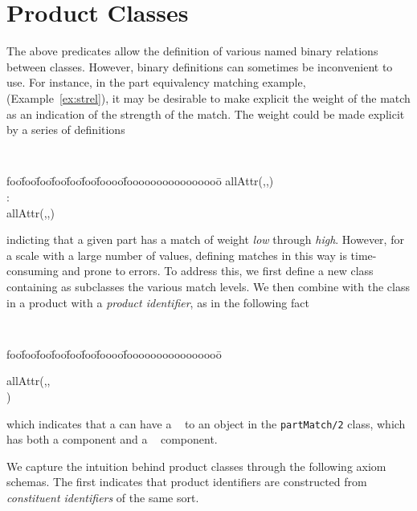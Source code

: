 \section{Product Classes}

The above predicates allow the definition of various named binary
relations between classes.  However, binary definitions can sometimes
be inconvenient to use.  For instance, in the part equivalency
matching example, (Example~\ref{ex:strel}), it may be desirable to
make explicit the weight of the match as an indication of the strength
of the match.  The weight could be made explicit by a series of
definitions
{\small 
{\tt 
\begin{tabbing}
foo\=foo\=foo\=foo\=foo\=foo\=foooo\=foooooooooooooooo\=\kill
\> allAttr(,,) \\
\> : \\
\> allAttr(,,)
\end{tabbing}
} } 
\noindent
indicting that a given part has a match of weight {\em low} through
{\em high}.  However, for a scale with a large number of values,
defining matches in this way is time-consuming and prone to errors.
To address this, we first define a new class {\tt {}}
containing as subclasses the various match levels.  We then combine
{\tt {}} with the class {\tt {}} in a
product with a {\em product identifier}, as in the following fact
{\small 
{\tt 
\begin{tabbing}
foo\=foo\=foo\=foo\=foo\=foo\=foooo\=foooooooooooooooo\=\kill
 
allAttr(,, \\
\> \> \> \> )
\end{tabbing}  } }
\noindent 
which indicates that a {\tt {}} can have a {\tt
{}} to an object in the {\tt partMatch/2}  class,
which has both a {\tt {}} component and a {\tt
{}} component.


We capture the intuition behind product classes through the following
axiom schemas.  The first indicates that product identifiers 
are constructed from {\em constituent identifiers} of the same sort.

